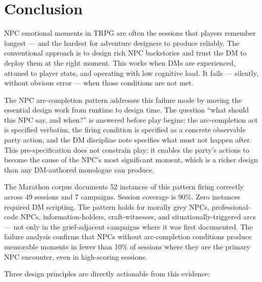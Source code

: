 
\section{Conclusion}
\label{sec:conclusion}

NPC emotional moments in TRPG are often the sessions that players remember
longest --- and the hardest for adventure designers to produce reliably.
The conventional approach is to design rich NPC backstories and trust the
DM to deploy them at the right moment. This works when DMs are experienced,
attuned to player state, and operating with low cognitive load. It fails ---
silently, without obvious error --- when those conditions are not met.

The NPC arc-completion pattern addresses this failure mode by moving the
essential design work from runtime to design time. The question ``what should
this NPC say, and when?'' is answered before play begins: the arc-completion act
is specified verbatim, the firing condition is specified as a concrete observable
party action, and the DM discipline note specifies what must not happen after.
This pre-specification does not constrain play; it enables the party's actions
to become the cause of the NPC's most significant moment, which is a richer
design than any DM-authored monologue can produce.

The Marathon corpus documents 52 instances of this pattern firing correctly
across 49 sessions and 7 campaigns. Session coverage is 90\%. Zero instances
required DM scripting. The pattern holds for morally grey NPCs, professional-code
NPCs, information-holders, craft-witnesses, and situationally-triggered arcs
--- not only in the grief-adjacent campaigns where it was first documented.
The failure analysis confirms that NPCs without arc-completion conditions
produce memorable moments in fewer than 10\% of sessions where they are the
primary NPC encounter, even in high-scoring sessions.

Three design principles are directly actionable from this evidence:

